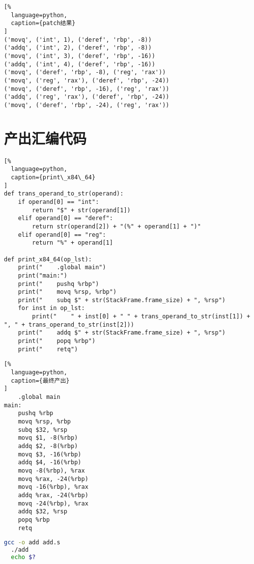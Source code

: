 \begin{lstlisting}[%
  language=python,
  caption={patch结果}
]
('movq', ('int', 1), ('deref', 'rbp', -8))
('addq', ('int', 2), ('deref', 'rbp', -8))
('movq', ('int', 3), ('deref', 'rbp', -16))
('addq', ('int', 4), ('deref', 'rbp', -16))
('movq', ('deref', 'rbp', -8), ('reg', 'rax'))
('movq', ('reg', 'rax'), ('deref', 'rbp', -24))
('movq', ('deref', 'rbp', -16), ('reg', 'rax'))
('addq', ('reg', 'rax'), ('deref', 'rbp', -24))
('movq', ('deref', 'rbp', -24), ('reg', 'rax'))
\end{lstlisting}

\section{产出汇编代码}

\begin{lstlisting}[%
  language=python,
  caption={print\_x84\_64}
]
def trans_operand_to_str(operand):
    if operand[0] == "int":
        return "$" + str(operand[1])
    elif operand[0] == "deref":
        return str(operand[2]) + "(%" + operand[1] + ")"
    elif operand[0] == "reg":
        return "%" + operand[1]

def print_x84_64(op_lst):
    print("    .global main")
    print("main:")
    print("    pushq %rbp")
    print("    movq %rsp, %rbp")
    print("    subq $" + str(StackFrame.frame_size) + ", %rsp")
    for inst in op_lst:
        print("    " + inst[0] + " " + trans_operand_to_str(inst[1]) + ", " + trans_operand_to_str(inst[2]))
    print("    addq $" + str(StackFrame.frame_size) + ", %rsp")
    print("    popq %rbp")
    print("    retq")
\end{lstlisting}

\begin{lstlisting}[%
  language=python,
  caption={最终产出}
]
    .global main
main:
    pushq %rbp
    movq %rsp, %rbp
    subq $32, %rsp
    movq $1, -8(%rbp)
    addq $2, -8(%rbp)
    movq $3, -16(%rbp)
    addq $4, -16(%rbp)
    movq -8(%rbp), %rax
    movq %rax, -24(%rbp)
    movq -16(%rbp), %rax
    addq %rax, -24(%rbp)
    movq -24(%rbp), %rax
    addq $32, %rsp
    popq %rbp
    retq
\end{lstlisting}


\begin{lstlisting}[language=bash,style=shellstyle]
  gcc -o add add.s
  ./add
  echo $?
\end{lstlisting}